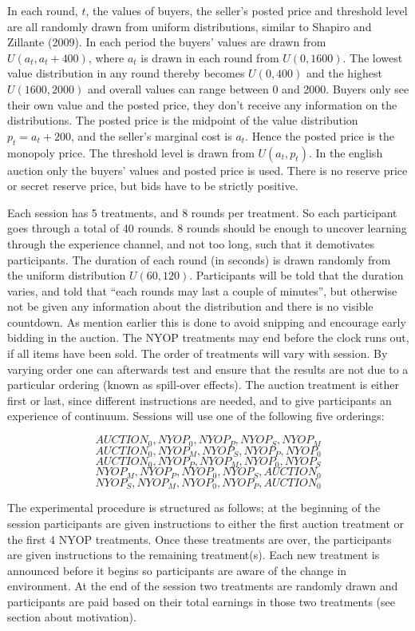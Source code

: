 \documentclass[a4paper,12pt]{article}
\begin{document}
	In each round, $t$, the values of buyers, the seller's posted price and threshold level are all randomly drawn from uniform distributions, similar to Shapiro and Zillante (2009). In each period the buyers' values are drawn from $U(a_t , a_t + 400)$, where $a_t$ is drawn in each round from $U(0, 1600)$. The lowest value distribution in any round thereby becomes $U(0, 400)$ and the highest $U(1600, 2000)$ and overall values can range between 0 and 2000. Buyers only see their own value and the posted price, they don't receive any information on the distributions. The posted price is the midpoint of the value distribution $p_t = a_t + 200$, and the seller's marginal cost is $a_t$. Hence the posted price is the monopoly price. The threshold level is drawn from $U(a_t, p_t)$. In the english auction only the buyers' values and posted price is used. There is no reserve price or secret reserve price, but bids have to be strictly positive.

	Each session has 5 treatments, and 8 rounds per treatment. So each participant goes through a total of 40 rounds. 8 rounds should be enough to uncover learning through the experience channel, and not too long, such that it demotivates participants. The duration of each round (in seconds) is drawn randomly from the uniform distribution $U(60, 120)$. Participants will be told that the duration varies, and told that ``each rounds may last a couple of minutes'', but otherwise not be given any information about the distribution and there is no visible countdown. As mention earlier this is done to avoid snipping and encourage early bidding in the auction. The NYOP treatments may end before the clock runs out, if all items have been sold. The order of treatments will vary with session. By varying order one can afterwards test and ensure that the results are not due to a particular ordering (known as spill-over effects). The auction treatment is either first or last, since different instructions are needed, and to give participants an experience of continuum. Sessions will use one of the following five orderings:

\[	{AUCTION_0, NYOP_0, NYOP_P, NYOP_S, NYOP_M} \]
\[	{AUCTION_0, NYOP_M, NYOP_S, NYOP_P, NYOP_0} \]
\[	{AUCTION_0, NYOP_P, NYOP_M, NYOP_0, NYOP_S} \]
\[	{NYOP_M, NYOP_P, NYOP_0, NYOP_S, AUCTION_0} \]
\[	{NYOP_S, NYOP_M, NYOP_0, NYOP_P, AUCTION_0} \]
	
	The experimental procedure is structured as follows; at the beginning of the session participants are given instructions to either the first auction treatment or the first 4 NYOP treatments. Once these treatments are over, the participants are given instructions to the remaining treatment(s). Each new treatment is announced before it begins so participants are aware of the change in environment. At the end of the session two treatments are randomly drawn and participants are paid based on their total earnings in those two treatments (see section about motivation).
\end{document}
